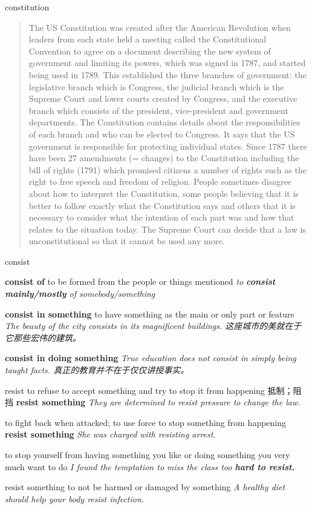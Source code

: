 \begin{DefWord}{constitution}
    \begin{quotation}
        The US Constitution was created after the American Revolution when leaders from each state held a meeting called the Constitutional Convention to agree on a document describing the new system of government and limiting its powers, which was signed in 1787, and started being used in 1789. This established the three branches of government: the legislative branch which is Congress, the judicial branch which is the Supreme Court and lower courts created by Congress, and the executive branch which consists of the president, vice-president and government departments. The Constitution contains details about the responsibilities of each branch and who can be elected to Congress. It says that the US government is responsible for protecting individual states. Since 1787 there have been 27 amendments (= changes) to the Constitution including the bill of rights (1791) which promised citizens a number of rights such as the right to free speech and freedom of religion. People sometimes disagree about how to interpret the Constitution, some people believing that it is better to follow exactly what the Constitution says and others that it is necessary to consider what the intention of each part was and how that relates to the situation today. The Supreme Court can decide that a law is unconstitutional so that it cannot be used any more.
    \end{quotation}
\end{DefWord}

\begin{DefWord}{consist}

    \textbf{consist of}
    to be formed from the people or things mentioned
    \textit{to \textbf{consist mainly/mostly} of somebody/something}

    \textbf{consist in something}
    to have something as the main or only part or feature
    \textit{The beauty of the city consists in its magnificent buildings. 这座城市的美就在于它那些宏伟的建筑。}

    \textbf{consist in doing something} \textit{True education does not consist in simply being taught facts. 真正的教育并不在于仅仅讲授事实。}
\end{DefWord}

\begin{DefWord}{resist} to refuse to accept something and try to stop it from happening 抵制；阻挡
    \textbf{resist something} \textit{They are determined to resist pressure to change the law.}

    to fight back when attacked; to use force to stop something from happening
    \textbf{resist something} \textit{She was charged with resisting arrest.}

    to stop yourself from having something you like or doing something you very much want to do
    \textit{I found the temptation to miss the class too \textbf{hard to resist.}}

    resist something to not be harmed or damaged by something
    \textit{A healthy diet should help your body resist infection.}
\end{DefWord}


